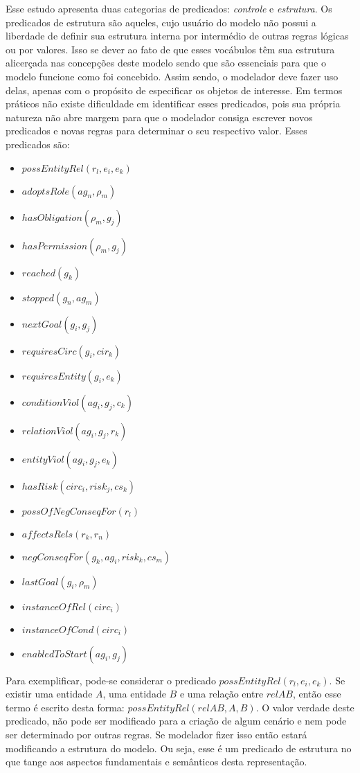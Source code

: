 Esse estudo apresenta duas categorias de predicados: \textit{controle} e \textit{estrutura}. Os predicados de estrutura são aqueles, cujo usuário do modelo não possui a liberdade de definir sua estrutura interna por intermédio de outras regras lógicas ou por valores. Isso se dever ao fato de que esses vocábulos têm sua estrutura alicerçada nas concepções deste modelo sendo que são essenciais para que o modelo funcione como foi concebido. Assim sendo, o modelador deve fazer uso delas, apenas com o propósito de especificar os objetos de interesse. Em termos práticos não existe dificuldade em identificar esses predicados, pois sua própria natureza não abre margem para que o modelador consiga escrever novos predicados e novas regras para determinar o seu respectivo valor. Esses predicados são:

\begin{itemize}
    \item $possEntityRel(r_l,e_i,e_k)$
    \item $adoptsRole(ag_n,\rho_m)$
    \item $hasObligation(\rho_m,g_j)$
    \item $hasPermission(\rho_m, g_j)$
    \item $reached(g_k)$
    \item $stopped(g_n, ag_m)$
    \item $nextGoal(g_i,g_j)$
    \item $requiresCirc(g_i,cir_k)$
    \item $requiresEntity(g_i,e_k)$
    \item $conditionViol(ag_i,g_j,c_k)$
    \item $relationViol(ag_i,g_j,r_k)$
    \item $entityViol(ag_i,g_j,e_k)$
    \item $hasRisk(circ_i, risk_j, cs_k)$
    \item $possOfNegConseqFor(r_l)$
    \item $affectsRels(r_k,r_n)$
    \item $negConseqFor(g_k, ag_i,risk_k,cs_m)$
    \item $lastGoal(g_i,\rho_m)$
    \item $instanceOfRel(circ_i)$
    \item $instanceOfCond(circ_i)$
    \item $enabledToStart(ag_i,g_j)$ 
\end{itemize}

Para exemplificar, pode-se considerar o predicado $possEntityRel(r_l,e_i,e_k)$. Se existir uma entidade $A$, uma entidade $B$ e uma relação entre $relAB$, então esse termo é escrito desta forma: $possEntityRel(relAB,A,B)$. O valor verdade deste predicado, não pode ser modificado para a criação de algum cenário e nem pode ser determinado por outras regras. Se modelador fizer isso então estará modificando a estrutura do modelo. Ou seja, esse é um predicado de estrutura no que tange aos aspectos fundamentais e semânticos desta representação. 

